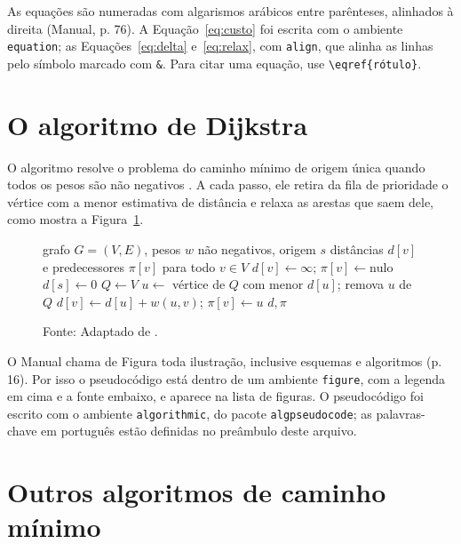 \documentclass[tese,capa]{texufpel}
\begin{document}
As equações são numeradas com algarismos arábicos entre parênteses, alinhados
à direita (Manual, p. 76). A Equação~\eqref{eq:custo} foi escrita com o
ambiente \texttt{equation}; as Equações~\eqref{eq:delta} e~\eqref{eq:relax},
com \texttt{align}, que alinha as linhas pelo símbolo marcado com \verb|&|.
Para citar uma equação, use \verb|\eqref{rótulo}|.

\section{O algoritmo de Dijkstra}
\label{sec:dijkstra}

O algoritmo resolve o problema do caminho mínimo de origem única quando todos
os pesos são não negativos \citep{Dijkstra:1959:NTP}. A cada passo, ele retira
da fila de prioridade o vértice com a menor estimativa de distância e relaxa
as arestas que saem dele, como mostra a Figura~\ref{fig:dijkstra}.

\begin{figure}[htbp]
  \caption{Pseudocódigo do algoritmo de Dijkstra}
  \label{fig:dijkstra}
  \begin{algorithmic}[1]
    \Require grafo $G = (V, E)$, pesos $w$ não negativos, origem $s$
    \Ensure distâncias $d[v]$ e predecessores $\pi[v]$ para todo $v \in V$
      \State $d[v] \gets \infty$; \quad $\pi[v] \gets \text{nulo}$
    \EndFor
    \State $d[s] \gets 0$
    \State $Q \gets V$ 
      \State $u \gets$ vértice de $Q$ com menor $d[u]$; remova $u$ de $Q$
          \State $d[v] \gets d[u] + w(u, v)$; \quad $\pi[v] \gets u$
        \EndIf
      \EndFor
    \EndWhile
    \State \Return $d, \pi$
  \end{algorithmic}
  \caption*{Fonte: Adaptado de \citet{Cormen:2022:IA}.}
\end{figure}

O Manual chama de Figura toda ilustração, inclusive esquemas e algoritmos
(p. 16). Por isso o pseudocódigo está dentro de um ambiente \texttt{figure},
com a legenda em cima e a fonte embaixo, e aparece na lista de figuras. O
pseudocódigo foi escrito com o ambiente \texttt{algorithmic}, do pacote
\texttt{algpseudocode}; as palavras-chave em português estão definidas no
preâmbulo deste arquivo.

\section{Outros algoritmos de caminho mínimo}
\label{sec:outros}
\end{document}
